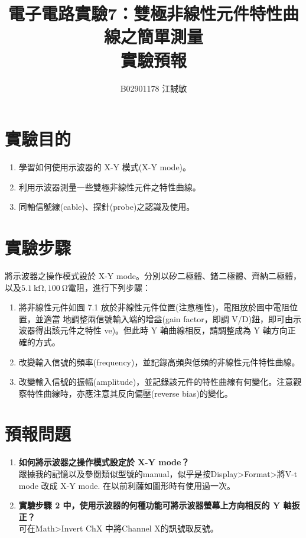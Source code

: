 \documentclass[12pt, a4paper]{article}
\title{ \bf {\huge 電子電路實驗7：雙極非線性元件特性曲線之簡單測量}\\ 實驗預報}
\author{B02901178 江誠敏}
\def\large{\fontsize{14}{21}\selectfont}
\begin{document}
\maketitle

\section{實驗目的}
\begin{enumerate}[itemsep=0pt]
  \item 學習如何使用示波器的 X-Y 模式(X-Y mode)。
  \item 利用示波器測量一些雙極非線性元件之特性曲線。
  \item 同軸信號線(cable)、探針(probe)之認識及使用。
\end{enumerate}


\section{實驗步驟}
將示波器之操作模式設於 X-Y mode。分別以矽二極體、鍺二極體、齊納二極體，以及$\SI{5.1}\kohm, \SI{100}\ohm$電阻，進行下列步驟：
\begin{enumerate}[itemsep=0pt]
  \item 將非線性元件如圖 7.1 放於非線性元件位置(注意極性)，電阻放於圖中電阻位置，並適當 地調整兩信號輸入端的增益(gain factor，即調 V/D)鈕，即可由示波器得出該元件之特性
    ve)。但此時 Y 軸曲線相反，請調整成為 Y 軸方向正確的方式。
  \item 改變輸入信號的頻率(frequency)，並記錄高頻與低頻的非線性元件特性曲線。
  \item 改變輸入信號的振幅(amplitude)，並記錄該元件的特性曲線有何變化。注意觀察特性曲線時，亦應注意其反向偏壓(reverse bias)的變化。
\end{enumerate}

\begin{figure}[H]
  \centering
\end{figure}



\section{預報問題}

\begin{enumerate}[itemsep=20pt, topsep=10pt]
  \item {\large\bf 如何將示波器之操作模式設定於 X-Y mode？} \\[10pt]
    跟據我的記憶以及參閱類似型號的manual，似乎是按Display>Format>將V-t mode 改成 X-Y mode. 在以前利薩如圖形時有使用過一次。
  \item {\large\bf 實驗步驟 2 中，使用示波器的何種功能可將示波器螢幕上方向相反的 Y 軸扳正？
    } \\[10pt]
    可在Math>Invert ChX 中將Channel X的訊號取反號。

\end{enumerate}
\end{document}
